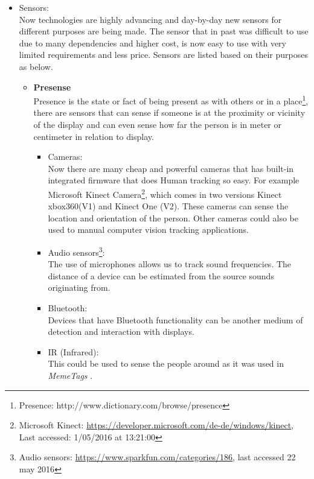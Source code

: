 \begin{itemize}
\begin{itemize}
\begin{itemize}
\end{itemize}

\end{itemize}

\item Sensors: \\
Now technologies are highly advancing and day-by-day new sensors for different purposes are being made. The sensor that in past was difficult to use due to many dependencies and higher cost, is now easy to use with very limited requirements and less price. Sensors are listed based on their purposes as below.


\begin{itemize}

\item \textbf{Presense} \\
Presence is the state or fact of being present as with others or in a place\footnote{Presence: http://www.dictionary.com/browse/presence}, there are sensors that can sense if someone is at the proximity or vicinity of the display and can even sense how far the person is in meter or centimeter in relation to display. 


\begin{itemize}
\item Cameras: \\
Now there are many cheap and powerful cameras that has built-in integrated firmware that does Human tracking so easy. For example Microsoft Kinect Camera\footnote{Microsoft Kinect: \url{https://developer.microsoft.com/de-de/windows/kinect}, Last accessed: 1/05/2016 at 13:21:00}, which comes in two versions Kinect xbox360(V1) and Kinect One (V2). These cameras can sense the location and orientation of the person. Other cameras could also be used to manual computer vision tracking applications.

\item Audio sensors\footnote{Audio sensors: \url{https://www.sparkfun.com/categories/186}, last accessed 22 may 2016}: \\
The use of microphones allows us to track sound frequencies. The distance of a device can be estimated from the source sounds originating from.

\item Bluetooth: \\
Devices that have Bluetooth functionality can be another medium of detection and interaction with displays.

\item IR (Infrared): \\
This could be used to sense the people around as it was used in \emph{MemeTags} \cite{meme-tags}.


\end{itemize}
\end{itemize}
\end{itemize}
